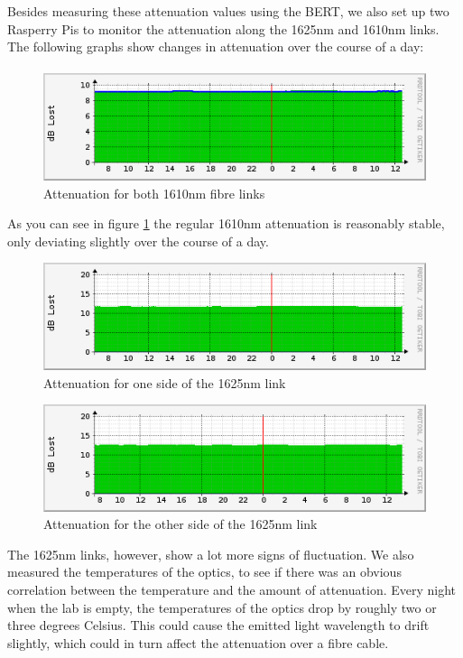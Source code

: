 \documentclass{article}
\begin{document}
Besides measuring these attenuation values using the BERT, we also set up two Rasperry Pis to monitor the attenuation along the 1625nm and 1610nm links.
The following graphs show changes in attenuation over the course of a day:\\

\paragraph{}
\begin{figure}[h!]
\centerline{\includegraphics[scale=0.7]{images/1610.png}}
\caption{Attenuation for both 1610nm fibre links}
\label{fig:1610}
\end{figure}
As you can see in figure \ref{fig:1610} the regular 1610nm attenuation is reasonably stable, only deviating slightly over the course of a day.
\begin{figure}[h!]
\centerline{\includegraphics[scale=0.7]{images/1625-1.png}}
\caption{Attenuation for one side of the 1625nm link}
\label{fig:1625-1}
\end{figure}
\begin{figure}[h!]
\centerline{\includegraphics[scale=0.7]{images/1625-2.png}}
\caption{Attenuation for the other side of the 1625nm link}
\label{fig:1625-2}
\end{figure}

The 1625nm links, however, show a lot more signs of fluctuation.
We also measured the temperatures of the optics, to see if there was an obvious correlation between the temperature and the amount of attenuation.
Every night when the lab is empty, the temperatures of the optics drop by roughly two or three degrees Celsius.
This could cause the emitted light wavelength to drift slightly, which could in turn affect the attenuation over a fibre cable.
\end{document}

